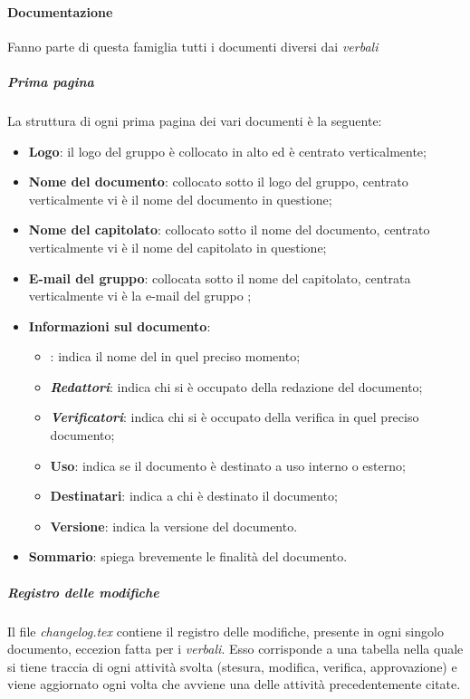 \paragraph{Documentazione}
Fanno parte di questa famiglia tutti i documenti diversi dai \textit{verbali}
\subparagraph{Prima pagina}
La struttura di ogni prima pagina dei vari documenti è la seguente:
\begin {itemize}
    \item \textbf{Logo}: il logo del gruppo \groupName{} è collocato in alto ed è centrato verticalmente;
    \item \textbf{Nome del documento}: collocato sotto il logo del gruppo, centrato verticalmente vi è il nome del documento in questione;
    \item \textbf{Nome del capitolato}: collocato sotto il nome del documento, centrato verticalmente vi è il nome del capitolato in questione;
    \item \textbf{E-mail del gruppo}: collocata sotto il nome del capitolato, centrata verticalmente vi è la e-mail del gruppo \groupName{};
    \item \textbf{Informazioni sul documento}:
        \begin{itemize}
            \item \textbf{\roleProjectManager}: indica il nome del \roleProjectManagerLow{} in quel preciso momento;
            \item \textbf{\textit{Redattori}}: indica chi si è occupato della redazione del documento;
            \item \textbf{\textit{Verificatori}}: indica chi si è occupato della verifica in quel preciso documento;
            \item \textbf{Uso}: indica se il documento è destinato a uso interno o esterno;
            \item \textbf{Destinatari}: indica a chi è destinato il documento;
            \item \textbf{Versione}: indica la versione del documento. 
        \end{itemize}
    \item \textbf{Sommario}: spiega brevemente le finalità del documento.        
\end {itemize}
\subparagraph{Registro delle modifiche}
Il file \textit{changelog.tex} contiene il registro delle modifiche, presente in ogni singolo documento, eccezion fatta per i \textit{verbali}.
Esso corrisponde a una tabella nella quale si tiene traccia di ogni attività svolta (stesura, modifica, verifica, approvazione) e viene aggiornato ogni volta che avviene una delle attività precedentemente citate.
